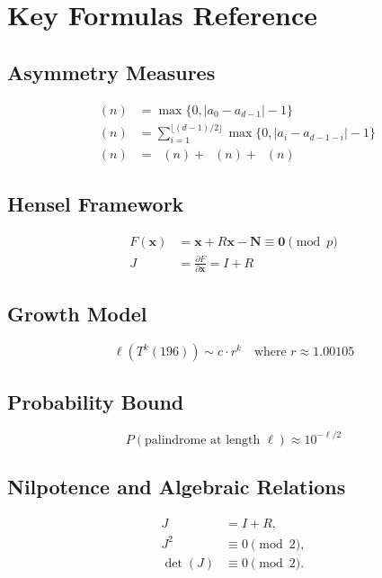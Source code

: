 \documentclass[11pt,a4paper]{article}
\theoremstyle{plain}
\theoremstyle{definition}
\DeclareMathOperator{\Aext}{A^{\text{(ext)}}}
\DeclareMathOperator{\Aint}{A^{\text{(int)}}}
\DeclareMathOperator{\Acarry}{A^{\text{(carry)}}}
\DeclareMathOperator{\Arobust}{A^{\text{(robust)}}}
\begin{document}
\section{Key Formulas Reference}

\subsection{Asymmetry Measures}
\begin{align}
\Aext(n) &= \max\{0, |a_0 - a_{d-1}| - 1\} \\
\Aint(n) &= \sum_{i=1}^{\lfloor (d-1)/2 \rfloor} \max\{0, |a_i - a_{d-1-i}| - 1\} \\
\Arobust(n) &= \Aext(n) + \Aint(n) + \Acarry(n)
\end{align}

\subsection{Hensel Framework}
\begin{align}
F(\mathbf{x}) &= \mathbf{x} + R\mathbf{x} - \mathbf{N} \equiv \mathbf{0} \pmod{p} \\
J &= \frac{\partial F}{\partial \mathbf{x}} = I + R
\end{align}

\subsection{Growth Model}
\begin{equation}
\ell(T^k(196)) \sim c \cdot r^k \quad \text{where } r \approx 1.00105
\end{equation}

\subsection{Probability Bound}
\begin{equation}
P(\text{palindrome at length } \ell) \approx 10^{-\ell/2}
\end{equation}

\subsection{Nilpotence and Algebraic Relations}\label{app:nilpotence}
\begin{align}
J &= I + R, \\[4pt]
J^2 &\equiv 0 \pmod{2}, \\[4pt]
\det(J) &\equiv 0 \pmod{2}.
\end{align}
\end{document}
